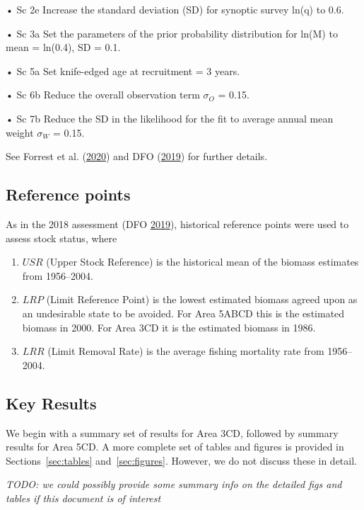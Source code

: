 \documentclass[11pt]{book}
\begin{document}
• Sc 2e Increase the standard deviation (SD) for synoptic survey ln(q) to 0.6.

• Sc 3a Set the parameters of the prior probability distribution for ln(M) to mean = ln(0.4), SD = 0.1.

• Sc 5a Set knife-edged age at recruitment = 3 years.

• Sc 6b Reduce the overall observation term \(\sigma_O\) = 0.15.

• Sc 7b Reduce the SD in the likelihood for the fit to average annual mean weight \(\sigma_W\) = 0.15.

See Forrest et al. (\protect\hyperlink{ref-forrest2020}{2020}) and DFO (\protect\hyperlink{ref-dfo2019}{2019}) for further details.

\hypertarget{reference-points}{%
\subsection{Reference points}\label{reference-points}}

As in the 2018 assessment (DFO \protect\hyperlink{ref-dfo2019}{2019}), historical reference points were used to assess stock status, where
\begin{enumerate}
\def\labelenumi{\arabic{enumi}.}
\item
  \(USR\) (Upper Stock Reference) is the historical mean of the biomass estimates from 1956--2004.
\item
  \(LRP\) (Limit Reference Point) is the lowest estimated biomass agreed upon as an undesirable state to be avoided. For Area 5ABCD this is the estimated biomass in 2000. For Area 3CD it is the estimated biomass in 1986.
\item
  \(LRR\) (Limit Removal Rate) is the average fishing mortality rate from 1956--2004.
\end{enumerate}
\hypertarget{sec:summary-results}{%
\subsection{Key Results}\label{sec:summary-results}}

We begin with a summary set of results for Area 3CD, followed by summary results for Area 5CD. A more complete set of tables and figures is provided in Sections~\ref{sec:tables} and~\ref{sec:figures}. However, we do not discuss these in detail.

\emph{TODO: we could possibly provide some summary info on the detailed figs and tables if this document is of interest}
\end{document}
